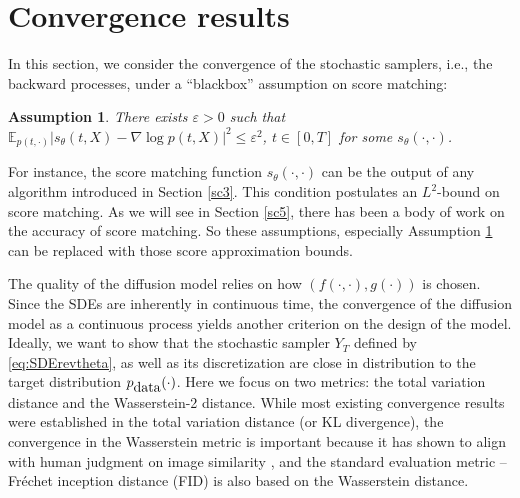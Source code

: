 \documentclass[letterpaper,11pt,reqno]{amsart}
\newtheorem{assump}[theorem]{Assumption}
\newtheorem*{assumpab}{Assumption 5.1'}
\numberwithin{equation}{section}
\begin{document}
\section{Convergence results}
\label{sc4}

\quad In this section, 
we consider the convergence of the stochastic samplers, i.e., the backward processes,
under a ``blackbox'' assumption on score matching:
\begin{assump}
\label{assump:blackbox}
There exists $\varepsilon > 0$ such that 
$\mathbb{E}_{p(t, \cdot)}|s_{\theta}(t,X) - \nabla \log p (t, X)|^2 \le \varepsilon^2$, $t \in [0,T]$ 
for some $s_\theta(\cdot, \cdot)$.
\end{assump}
For instance, the score matching function $s_\theta(\cdot, \cdot)$
can be the output of any algorithm introduced in Section \ref{sc3}.
This condition postulates an $L^2$-bound on score matching.
As we will see in Section \ref{sc5},
there has been a body of work on the accuracy of score matching.
So these assumptions, especially Assumption \ref{assump:blackbox}
can be replaced with those score approximation bounds.

\quad The quality of the diffusion model relies on how $(f(\cdot, \cdot), g(\cdot))$ is chosen.
Since the SDEs are inherently in continuous time,
the convergence of the diffusion model as a continuous process
yields another criterion on the design of the model. 
 Ideally, we want to show that 
the stochastic sampler $Y_T$ defined by \eqref{eq:SDErevtheta},
as well as its discretization are close in distribution to the target distribution $p_{\tiny \mbox{data}}(\cdot)$.
Here we focus on two metrics:
the total variation distance and the Wasserstein-2 distance. 
While most existing convergence results were established in
the total variation distance (or KL divergence),
the convergence in the Wasserstein metric is important 
because 
it has shown to align with human judgment on image
similarity \cite{Bor19}, and the standard evaluation metric -- Fréchet inception distance (FID)
is also based on the Wasserstein distance. 
\end{document}
